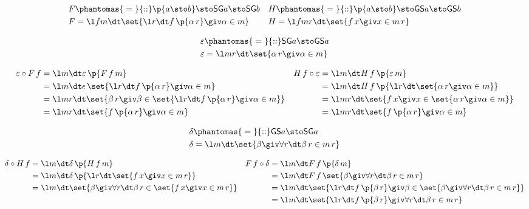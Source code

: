 \documentclass{article}
\newcommand{\SG}[1]{\textsf{SG}#1}
\newcommand{\GS}[1]{\textsf{GS}#1}
\newcommand{\type}{\phantomas{{}={}}{::}}
\begin{document}
\begin{align*}
F &\type \p{a\sto b} \sto \SG{a} \sto \SG{b}
&
H &\type \p{a\sto b} \sto \GS{a} \sto \GS{b}
%
\\
%
F &= \l fm\dt \set{\l r\dt f\,\p{\alpha\,r} \giv \alpha \in m}
&
H &= \l fmr\dt \set{f\,x \giv x\in m\,r}
\end{align*}

\begin{align*}
\varepsilon &\type \SG{a} \sto \GS{a}\\
\varepsilon &= \l mr\dt \set{\alpha\,r \giv \alpha\in m}
\end{align*}

\bigskip

\begin{center}
\end{center}

\bigskip

\begin{align*}
\varepsilon \circ F\,f
&=
\l m\dt \varepsilon\,\p{F\,f\,m}
&
H\,f \circ \varepsilon
&=
\l m\dt H\,f\,\p{\varepsilon\,m}
%
\\
%
&= \l m\dt \epsilon\,\set{\l r\dt f\,\p{\alpha\,r} \giv \alpha\in m}
&
&= \l m\dt H\,f\,\p{\l r\dt \set{\alpha\,r \giv \alpha\in m}}
%
\\
%
&= \l mr\dt \set{\beta\,r \giv \beta\in \set{\l r\dt f\,\p{\alpha\,r} \giv \alpha\in m}}
&
&= \l mr\dt \set{f\,x \giv x \in \set{\alpha\,r \giv \alpha\in m}}
%
\\
%
&= \l mr\dt \set{f\,\p{\alpha\,r} \giv \alpha\in m}
&
&= \l mr\dt \set{f\,\p{\alpha\,r} \giv \alpha\in m}
\end{align*}

\dotfill


\begin{align*}
\delta &\type \GS{a} \sto \SG{a}\\
\delta &= \l m\dt \set{\beta \giv \forall r\dt \beta\,r \in m\,r}
\end{align*}


\begin{align*}
\delta \circ H\,f
&=
\l m\dt \delta\,\p{H\,f\,m}
&
F\,f \circ \delta
&=
\l m\dt F\,f\,\p{\delta\,m}
%
\\
%
&= \l m\dt \delta\,\p{\l r\dt \set{f\,x \giv x\in m\,r}}
&
&= \l m\dt F\,f\,\set{\beta \giv \forall r\dt \beta\,r \in m\,r}
%
\\
%
&= \l m\dt \set{\beta \giv \forall r\dt \beta\,r \in \set{f\,x \giv x\in m\,r}}
&
&= \l m\dt \set{\l r\dt f\,\p{\beta\,r} \giv \beta \in \set{\beta \giv \forall r\dt \beta\,r \in m\,r}}
%
\\
%
&
&
&= \l m\dt \set{\l r\dt f\,\p{\beta\,r} \giv \forall r\dt \beta\,r\in m\,r}
\end{align*}
\end{document}
